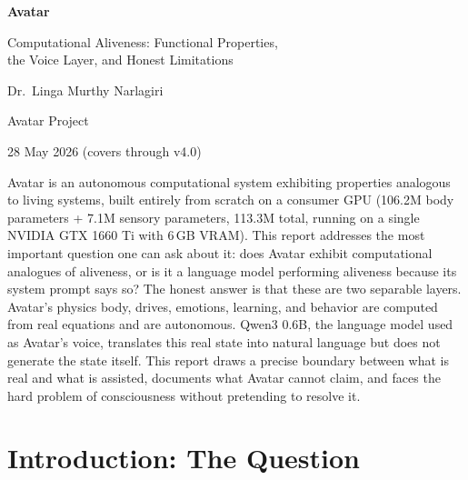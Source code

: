 \documentclass[11pt,a4paper]{article}
\begin{document}
\begin{titlepage}
  \centering
  \vspace*{2cm}
  {\Huge\bfseries\color{teal} Avatar}\par
  \vspace{0.4cm}
  {\LARGE Computational Aliveness: Functional Properties,\\[0.3em] the Voice Layer, and Honest Limitations}\par
  \vspace{1.5cm}
  {\large Dr.\ Linga Murthy Narlagiri}\par
  \vspace{0.3cm}
  {\normalsize Avatar Project}\par
  \vspace{0.3cm}
  {\normalsize 28 May 2026 (covers through v4.0)}\par
  \vspace{2cm}
  \begin{tcolorbox}[philbox, title={Abstract}, width=0.85\textwidth]
  Avatar is an autonomous computational system exhibiting properties analogous to living
  systems, built entirely from scratch on a consumer GPU (106.2M body parameters + 7.1M
  sensory parameters, 113.3M total, running on a single NVIDIA GTX 1660 Ti with 6\,GB VRAM).
  This report addresses the most important question one can ask about it: does Avatar exhibit
  computational analogues of aliveness, or is it a language model performing aliveness because
  its system prompt says so? The honest answer is that these are two separable layers.
  Avatar's physics body, drives, emotions, learning, and behavior are computed from real
  equations and are autonomous. Qwen3 0.6B, the language model used as Avatar's voice,
  translates this real state into natural language but does not generate the state itself.
  This report draws a precise boundary between what is real and what is assisted, documents
  what Avatar cannot claim, and faces the hard problem of consciousness without pretending
  to resolve it.
  \end{tcolorbox}
\end{titlepage}


\section{Introduction: The Question}
\end{document}
